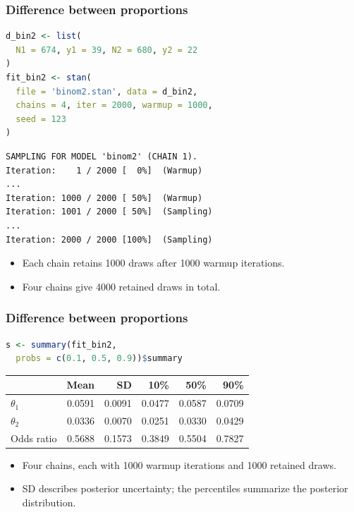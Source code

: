 \documentclass[10pt]{beamer}
\begin{document}
\begin{frame}[fragile]

\frametitle{Difference between proportions}

  {\small
\begin{lstlisting}[language=R]
d_bin2 <- list(
  N1 = 674, y1 = 39, N2 = 680, y2 = 22
)
fit_bin2 <- stan(
  file = 'binom2.stan', data = d_bin2,
  chains = 4, iter = 2000, warmup = 1000,
  seed = 123
)
\end{lstlisting}
  }

  {\footnotesize
\begin{lstlisting}
SAMPLING FOR MODEL 'binom2' (CHAIN 1).
Iteration:    1 / 2000 [  0%]  (Warmup)
...
Iteration: 1000 / 2000 [ 50%]  (Warmup)
Iteration: 1001 / 2000 [ 50%]  (Sampling)
...
Iteration: 2000 / 2000 [100%]  (Sampling)
\end{lstlisting}
  }

  \begin{itemize}
  \item Each chain retains 1000 draws after 1000 warmup iterations.
  \item Four chains give 4000 retained draws in total.
  \end{itemize}

\end{frame}

\begin{frame}[fragile]

\frametitle{Difference between proportions}

  {\small
\begin{lstlisting}[language=R]
s <- summary(fit_bin2,
  probs = c(0.1, 0.5, 0.9))$summary
\end{lstlisting}
  }

  \begin{center}
  {\small\setlength{\tabcolsep}{4pt}
  \begin{tabular}{lrrrrr}
  & Mean & SD & 10\% & 50\% & 90\% \\
  \hline
  $\theta_1$ & 0.0591 & 0.0091 & 0.0477 & 0.0587 & 0.0709 \\
  $\theta_2$ & 0.0336 & 0.0070 & 0.0251 & 0.0330 & 0.0429 \\
  Odds ratio & 0.5688 & 0.1573 & 0.3849 & 0.5504 & 0.7827
  \end{tabular}}
  \end{center}

  \begin{itemize}
  \item Four chains, each with 1000 warmup iterations and 1000 retained draws.
  \item SD describes posterior uncertainty; the percentiles summarize the posterior distribution.
  \end{itemize}

\end{frame}
\end{document}
